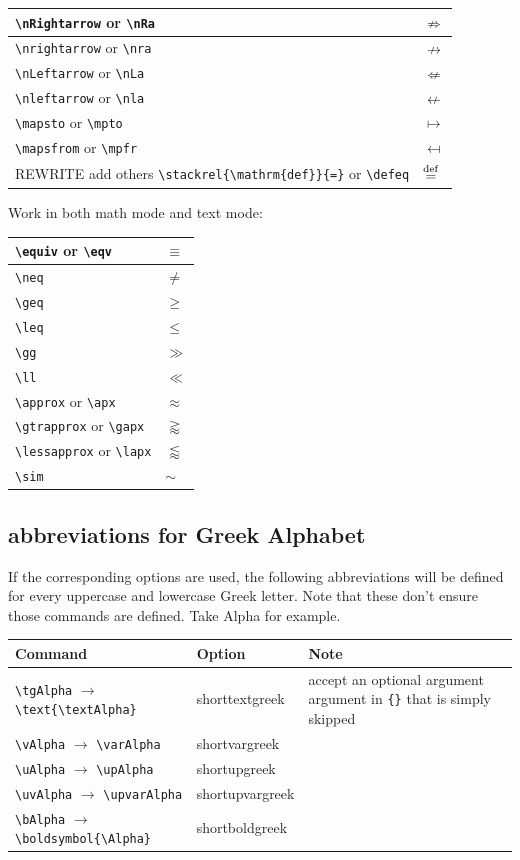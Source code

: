 \documentclass[a4paper,12pt]{article}
\begin{document}
\begin{longtable}[c]{|p{}|p{}|}
\verb|\nRightarrow| or \verb|\nRa| & $\nRightarrow$ \\\hline
\verb|\nrightarrow| or \verb|\nra| & $\nrightarrow$ \\\hline
\verb|\nLeftarrow| or \verb|\nLa| & $\nLeftarrow$ \\\hline
\verb|\nleftarrow| or \verb|\nla| & $\nleftarrow$ \\\hline
\verb|\mapsto| or \verb|\mpto| & $\mapsto$ \\\hline
\verb|\mapsfrom| or \verb|\mpfr| & $\mapsfrom$ \\\hline
REWRITE add others
\verb|\stackrel{\mathrm{def}}{=}| or \verb|\defeq| & $\stackrel{\mathrm{def}}{=}$ \\\hline
\end{longtable}
Work in both math mode and text mode:
\begin{longtable}[c]{|p{}|p{}|}
\hline
\verb|\equiv| or \verb|\eqv| & $\equiv$ \\\hline
\verb|\neq| & $\neq$ \\\hline
\verb|\geq| & $\geq$ \\\hline
\verb|\leq| & $\leq$ \\\hline
\verb|\gg| & $\gg$ \\\hline
\verb|\ll| & $\ll$ \\\hline
\verb|\approx| or \verb|\apx| & $\approx$ \\\hline
\verb|\gtrapprox| or \verb|\gapx| & $\gtrapprox$ \\\hline
\verb|\lessapprox| or \verb|\lapx| & $\lessapprox$ \\\hline
\verb|\sim| & $\sim$ \\\hline
\end{longtable}



\subsection{abbreviations for Greek Alphabet}
If the corresponding options are used, the following abbreviations will be defined for every uppercase and lowercase Greek letter. Note that these don’t ensure those commands are defined. Take Alpha for example.
\begin{longtable}[c]{|p{}|p{}|p{}|}
\hline
Command & Option & Note \\\hline
\verb|\tgAlpha| $\rightarrow$ \verb|\text{\textAlpha}| & shorttextgreek & accept an optional argument argument in \texttt{\{\}} that is simply skipped \\\hline
\verb|\vAlpha| $\rightarrow$ \verb|\varAlpha| & shortvargreek & \\\hline
\verb|\uAlpha| $\rightarrow$ \verb|\upAlpha| & shortupgreek & \\\hline
\verb|\uvAlpha| $\rightarrow$ \verb|\upvarAlpha| & shortupvargreek & \\\hline
\verb|\bAlpha| $\rightarrow$ \verb|\boldsymbol{\Alpha}| & shortboldgreek & \\\hline
\end{longtable}
\end{document}
